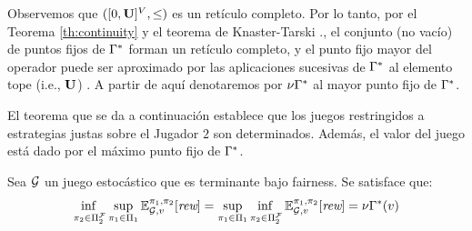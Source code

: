 Observemos que $([0,\mathbf{U}]^V, \leq)$ es un retículo completo. Por lo tanto, por el Teorema \ref{th:continuity} y el teorema de Knaster-Tarski \cite{davey1990introduction}., el conjunto (no vacío) de puntos fijos de $\Gamma^*$ forman un retículo completo, y el punto fijo mayor del operador puede ser aproximado por las aplicaciones sucesivas de $\Gamma^*$ al elemento tope (i.e., $\mathbf{U}$) \cite{davey1990introduction}. A partir de aquí denotaremos por $\nu \Gamma^*$ al mayor punto fijo de $\Gamma^*$.

El teorema que se da a continuación establece que los juegos restringidos a estrategias justas sobre el Jugador $2$ son determinados.
Además, el valor del juego está dado por el máximo punto fijo de $\Gamma^*$.
\begin{theorem}\label{th:game-determinacy} Sea $\mathcal{G}$ un juego estocástico que es terminante bajo fairness. Se satisface que:
\[\adjustlimits
	\inf_{\strat{2} \in \FairStrats{2}} \sup_{\strat{1} \in \Strategies{1}} \Expect{\strat{1}}{\strat{2}}_{\StochG,v}[\Rewards] = \adjustlimits \sup_{\strat{1} \in \Strategies{1}}   \inf_{\strat{2} \in \FairStrats{2}}  \Expect{\strat{1}}{\strat{2}}_{\StochG,v}[\Rewards] = \nu \Bellman(v)
\]
\end{theorem}
%
